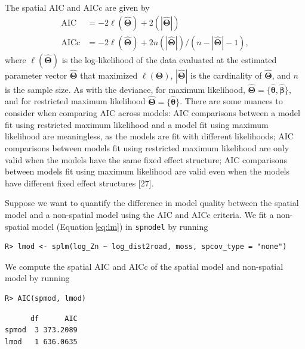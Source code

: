 \documentclass[10pt,letterpaper]{article}
\begin{document}
The spatial AIC and AICc are given by \begin{equation*}\label{eq:sp_aic}
  \begin{split}
    \text{AIC} & = -2\ell(\hat{\boldsymbol{\Theta}}) + 2(|\hat{\boldsymbol{\Theta}}|) \\
    \text{AICc} & = -2\ell(\hat{\boldsymbol{\Theta}}) + 2n(|\hat{\boldsymbol{\Theta}}|) / (n - |\hat{\boldsymbol{\Theta}}| - 1),
  \end{split}
\end{equation*} where \(\ell(\hat{\boldsymbol{\Theta}})\) is the
log-likelihood of the data evaluated at the estimated parameter vector
\(\hat{\boldsymbol{\Theta}}\) that maximized
\(\ell(\boldsymbol{\Theta})\), \(|\hat{\boldsymbol{\Theta}}|\) is the
cardinality of \(\hat{\boldsymbol{\Theta}}\), and \(n\) is the sample
size. As with the deviance, for maximum likelihood,
\(\hat{\boldsymbol{\Theta}} = \{\hat{\boldsymbol{\theta}}, \hat{\boldsymbol{\beta}}\}\),
and for restricted maximum likelihood
\(\hat{\boldsymbol{\Theta}} = \{\hat{\boldsymbol{\theta}}\}\). There are
some nuances to consider when comparing AIC across models: AIC
comparisons between a model fit using restricted maximum likelihood and
a model fit using maximum likelihood are meaningless, as the models are
fit with different likelihoods; AIC comparisons between models fit using
restricted maximum likelihood are only valid when the models have the
same fixed effect structure; AIC comparisons between models fit using
maximum likelihood are valid even when the models have different fixed
effect structures {[}27{]}.

Suppose we want to quantify the difference in model quality between the
spatial model and a non-spatial model using the AIC and AICc criteria.
We fit a non-spatial model (Equation\(~\)\ref{eq:lm}) in
\texttt{spmodel} by running

\begin{verbatim}
R> lmod <- splm(log_Zn ~ log_dist2road, moss, spcov_type = "none")
\end{verbatim}

We compute the spatial AIC and AICc of the spatial model and non-spatial
model by running

\begin{verbatim}
R> AIC(spmod, lmod)
\end{verbatim}

\begin{verbatim}
      df      AIC
spmod  3 373.2089
lmod   1 636.0635
\end{verbatim}
\end{document}
